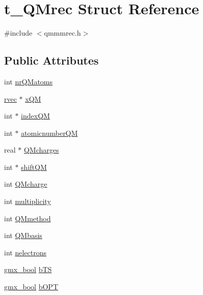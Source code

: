 \hypertarget{structt__QMrec}{\section{t\-\_\-\-Q\-Mrec \-Struct \-Reference}
\label{structt__QMrec}
}


{\ttfamily \#include $<$qmmmrec.\-h$>$}

\subsection*{\-Public \-Attributes}
\begin{DoxyCompactItemize}
\item 
int \hyperlink{structt__QMrec_a523283e825667cb98a9b67b72359c75f}{nr\-Q\-Matoms}
\item 
\hyperlink{share_2template_2gromacs_2types_2simple_8h_aa02a552a4abd2f180c282a083dc3a999}{rvec} $\ast$ \hyperlink{structt__QMrec_ad24a73d770a09aaf31bf053d345fc6c9}{x\-Q\-M}
\item 
int $\ast$ \hyperlink{structt__QMrec_a768ad7d04162d740b931fe7382a08ee1}{index\-Q\-M}
\item 
int $\ast$ \hyperlink{structt__QMrec_a2e82cdbb0c311920281f4bed5d11da7c}{atomicnumber\-Q\-M}
\item 
real $\ast$ \hyperlink{structt__QMrec_a80dea0fccf56f0b1e39f1711edc7e692}{\-Q\-Mcharges}
\item 
int $\ast$ \hyperlink{structt__QMrec_a0364be8b5e001edebd438230ba85938f}{shift\-Q\-M}
\item 
int \hyperlink{structt__QMrec_a6f262ab24e686e13baeb9fe4f5550c68}{\-Q\-Mcharge}
\item 
int \hyperlink{structt__QMrec_a73142133149e89b1499d94a86caf34b3}{multiplicity}
\item 
int \hyperlink{structt__QMrec_ae472ee9830af711c52012f5803ff5c76}{\-Q\-Mmethod}
\item 
int \hyperlink{structt__QMrec_aea10c9c4ec2b450b568b2a48dc12d7da}{\-Q\-Mbasis}
\item 
int \hyperlink{structt__QMrec_a16c21942d3f5cd41c76b29a27681bd5b}{nelectrons}
\item 
\hyperlink{include_2types_2simple_8h_a8fddad319f226e856400d190198d5151}{gmx\-\_\-bool} \hyperlink{structt__QMrec_ac0fdedfe5bc2ff2a89f8aa58978c4309}{b\-T\-S}
\item 
\hyperlink{include_2types_2simple_8h_a8fddad319f226e856400d190198d5151}{gmx\-\_\-bool} \hyperlink{structt__QMrec_a5834d470041a8803124b5caa48f48db6}{b\-O\-P\-T}

\end{DoxyCompactItemize}
